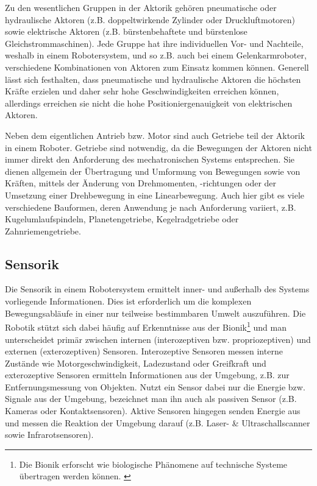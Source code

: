 \documentclass[11pt,ngerman,parskip=half]{scrartcl}
\begin{document}
Zu den wesentlichen Gruppen in der Aktorik gehören pneumatische oder
hydraulische Aktoren (z.B. doppeltwirkende Zylinder oder Druckluftmotoren)
sowie elektrische Aktoren (z.B. bürstenbehaftete und bürstenlose
Gleichstrommaschinen). Jede Gruppe hat ihre individuellen Vor- und Nachteile,
weshalb in einem Robotersystem, und so z.B. auch bei einem Gelenkarmroboter,
verschiedene Kombinationen von Aktoren zum Einsatz kommen können. Generell
lässt sich festhalten, dass pneumatische und hydraulische Aktoren die
höchsten Kräfte erzielen und daher sehr hohe Geschwindigkeiten erreichen
können, allerdings erreichen sie nicht die hohe Positioniergenauigkeit von
elektrischen Aktoren.
\parencite[vgl.][63--79]{hesse_taschenbuch_2016}

Neben dem eigentlichen Antrieb bzw. Motor sind auch Getriebe teil der Aktorik
in einem Roboter. Getriebe sind notwendig, da die Bewegungen der Aktoren
nicht immer direkt den Anforderung des mechatronischen Systems entsprechen.
Sie dienen allgemein der Übertragung und Umformung von Bewegungen sowie von
Kräften, mittels der Änderung von Drehmomenten, -richtungen oder der
Umsetzung einer Drehbewegung in eine Linearbewegung. Auch hier gibt es viele
verschiedene Bauformen, deren Anwendung je nach Anforderung variiert, z.B.
Kugelumlaufspindeln, Planetengetriebe, Kegelradgetriebe oder Zahnriemengetriebe.
\parencites[vgl.][121\psq]{maccloy_robotertechnik:_1989}
[][89--96]{hesse_taschenbuch_2016}

\subsection{Sensorik}
\label{subsec:john_sensorik}
Die Sensorik in einem Robotersystem ermittelt inner- und außerhalb des
Systems vorliegende Informationen. Dies ist erforderlich um die komplexen
Bewegungsabläufe in einer nur teilweise bestimmbaren Umwelt auszuführen. Die
Robotik stützt sich dabei häufig auf Erkenntnisse aus der Bionik\footnote{
Die Bionik erforscht wie biologische Phänomene auf technische Systeme
übertragen werden können. \parencite{feess_definition:_2018}} und man
unterscheidet primär zwischen internen (interozeptiven bzw. propriozeptiven)
und externen (exterozeptiven) Sensoren. Interozeptive Sensoren messen interne
Zustände wie Motorgeschwindigkeit, Ladezustand oder Greifkraft und
exterozeptive Sensoren ermitteln Informationen aus der Umgebung, z.B. zur
Entfernungsmessung von Objekten. Nutzt ein Sensor dabei nur die Energie bzw.
Signale aus der Umgebung, bezeichnet man ihn auch als passiven Sensor (z.B.
Kameras oder Kontaktsensoren). Aktive Sensoren hingegen senden Energie aus
und messen die Reaktion der Umgebung darauf (z.B. Laser- \&
Ultraschallscanner sowie Infrarotsensoren).
\parencites[vgl.][23\psq]{hertzberg_mobile_2012}[][73]
{kruse_mehrobjekt-zustandsschatzung_2013}[][97]{hesse_taschenbuch_2016}
\end{document}
